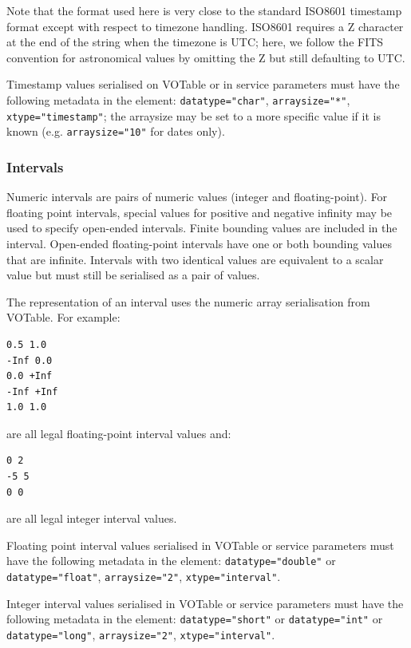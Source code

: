 \documentclass[11pt,letter]{ivoa}
\begin{document}
Note that the format used here is very close to the standard ISO8601 timestamp 
format except with respect to timezone handling. ISO8601 requires a Z character 
at the end of the string when the timezone is UTC; here, we follow the FITS 
\citep{std:FITS} convention for astronomical values by omitting the Z but still 
defaulting to UTC.

Timestamp values serialised on VOTable or in service parameters must have the following metadata in 
the  element: \verb|datatype="char"|,  \verb|arraysize="*"|,
\verb|xtype="timestamp"|; the arraysize may be set to a more specific value if it is known (e.g. 
\verb|arraysize="10"| for dates only).
 
\subsubsection{Intervals}
Numeric intervals are pairs of numeric values (integer and floating-point). For floating point 
intervals, special values for positive and negative infinity may be used to specify open-ended intervals. 
Finite bounding values are included in the interval. Open-ended floating-point 
intervals have one or both bounding values that are infinite. Intervals with two identical values
are equivalent to a scalar value but must still be serialised as a pair of values.

The representation of an interval uses the numeric array serialisation from 
VOTable. For example:

\begin{verbatim}
0.5 1.0
-Inf 0.0
0.0 +Inf
-Inf +Inf
1.0 1.0
\end{verbatim}

\noindent are all legal floating-point interval values and:

\begin{verbatim}
0 2
-5 5
0 0
\end{verbatim}

\noindent are all legal integer interval values. 

Floating point interval values serialised in VOTable or service parameters must have the following metadata in the 
 element: \verb|datatype="double"| or \verb|datatype="float"|, 
\verb|arraysize="2"|, \verb|xtype="interval"|.

Integer interval values serialised in VOTable or service parameters must have the following metadata in the 
 element: \verb|datatype="short"| or \verb|datatype="int"| or 
\verb|datatype="long"|, \verb|arraysize="2"|, \verb|xtype="interval"|.
\end{document}
